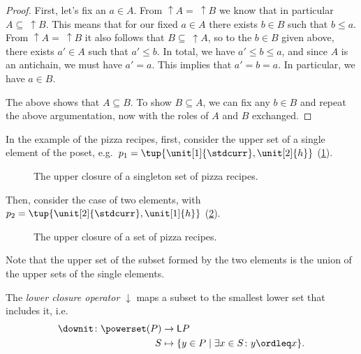 \begin{proof}
    First, let's fix an $a \in A$. From $\uparrow A = \ \uparrow B$ we know that in particular $A \subseteq \ \uparrow B$. This means that for our fixed $a \in A$ there exists $b \in B$ such that $b \leq a$. From $\uparrow A = \ \uparrow B$ it also follows that $B \subseteq \ \uparrow A$, so to the  $b \in B$ given above, there exists $a' \in A$ such that $a' \leq b$. In total, we have $a' \leq b \leq a$, and since $A$ is an antichain, we must have $a' = a$. This implies that $a' = b = a$. In particular, we have $a \in B$.

    The above shows that $A \subseteq B$. To show $B \subseteq A$, we can fix any $b \in B$ and repeat the above argumentation, now with the roles of $A$ and $B$ exchanged.
\end{proof}

In the example of the pizza recipes, first, consider the upper set of a single element of the poset, e.g.~$p_1=\tup{\unit[1]{\stdcurr},\unit[2]{h}}$  (\cref{fig:upperclosure_1}).
\begin{figure}[h!]
    \begin{center}
    \end{center}
    \caption{The upper closure of a singleton set of pizza recipes. \label{fig:upperclosure_1}}
\end{figure}
Then, consider the case of two elements, with~$p_2=\tup{\unit[2]{\stdcurr},\unit[1]{h}}$ (\cref{fig:upperclosure_2}).

\begin{figure}[h!]
    \begin{center}
    \end{center}
    \caption{The upper closure of a set of pizza recipes. \label{fig:upperclosure_2}}
\end{figure}
Note that the upper set of the subset formed by the two elements is the union of the upper sets of the single elements.

\begin{definition}
    The \emph{lower closure operator} $\downarrow$ maps a subset to the smallest lower set that includes it, i.e.
    \begin{equation*}
        \begin{aligned}
            \downit \colon \powerset(P)&\to \mathsf{L}P\\
            S&\mapsto \{ y\in P \mid \exists x\in S \colon y\ordleq x\}.
        \end{aligned}
    \end{equation*}
\end{definition}

